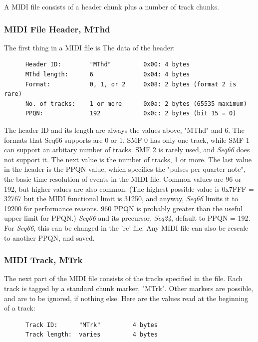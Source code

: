    A MIDI file consists of a header chunk plus a number of track chunks.

\subsubsection{MIDI File Header, MThd}
\label{subsubsec:midi_format_header}

   The first thing in a MIDI file is The data of the header:

   \begin{verbatim}
      Header ID:        "MThd"         0x00: 4 bytes
      MThd length:      6              0x04: 4 bytes
      Format:           0, 1, or 2     0x08: 2 bytes (format 2 is rare)
      No. of tracks:    1 or more      0x0a: 2 bytes (65535 maximum)
      PPQN:             192            0x0c: 2 bytes (bit 15 = 0)
   \end{verbatim}

   The header ID and its length are always the values above, "MThd" and 6.
   The formats that Seq66 supports are 0 or 1.
   SMF 0 has only one track, while SMF 1 can
   support an arbitary number of tracks.
   SMF 2 is rarely used, and \textsl{Seq66} does not support it.
   The next value is the number of tracks, 1 or more.
   The last value in the header is the
   PPQN value, which specifies the "pulses per quarter note", the
   basic time-resolution of events in the MIDI file.  Common values are 96 or
   192, but higher values are also common.
   (The highest possible value is 0x7FFF = 32767 but the MIDI functional limit
   is 31250, and anyway,
   \textsl{Seq66} limits it to 19200 for performance reasons.
   960 PPQN is probably greater than the useful upper limit for PPQN.)
   \textsl{Seq66} and its precursor, \textsl{Seq24}, default to PPQN = 192.
   For \textsl{Seq66}, this can be changed in the 'rc' file.
   Any MIDI file can also be rescale to another PPQN, and saved.

\subsubsection{MIDI Track, MTrk}
\label{subsubsec:midi_format_track}

   The next part of the MIDI file consists of the tracks specified in the file.
   Each track is tagged by
   a standard chunk marker, "MTrk".  Other markers are possible, and are to be
   ignored, if nothing else.  Here are the values read at the beginning of a
   track:

   \begin{verbatim}
      Track ID:      "MTrk"         4 bytes
      Track length:  varies         4 bytes
   \end{verbatim}

